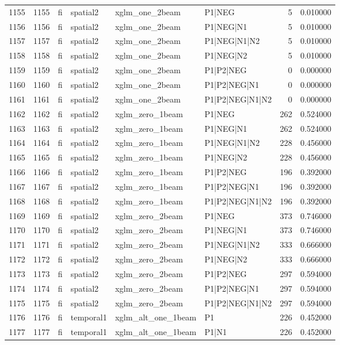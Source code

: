 \begin{tabular}{lrllllrr}
1155 & 1155 & fi & spatial2 & xglm_one_2beam & P1|NEG & 5 & 0.010000 \\
1156 & 1156 & fi & spatial2 & xglm_one_2beam & P1|NEG|N1 & 5 & 0.010000 \\
1157 & 1157 & fi & spatial2 & xglm_one_2beam & P1|NEG|N1|N2 & 5 & 0.010000 \\
1158 & 1158 & fi & spatial2 & xglm_one_2beam & P1|NEG|N2 & 5 & 0.010000 \\
1159 & 1159 & fi & spatial2 & xglm_one_2beam & P1|P2|NEG & 0 & 0.000000 \\
1160 & 1160 & fi & spatial2 & xglm_one_2beam & P1|P2|NEG|N1 & 0 & 0.000000 \\
1161 & 1161 & fi & spatial2 & xglm_one_2beam & P1|P2|NEG|N1|N2 & 0 & 0.000000 \\
1162 & 1162 & fi & spatial2 & xglm_zero_1beam & P1|NEG & 262 & 0.524000 \\
1163 & 1163 & fi & spatial2 & xglm_zero_1beam & P1|NEG|N1 & 262 & 0.524000 \\
1164 & 1164 & fi & spatial2 & xglm_zero_1beam & P1|NEG|N1|N2 & 228 & 0.456000 \\
1165 & 1165 & fi & spatial2 & xglm_zero_1beam & P1|NEG|N2 & 228 & 0.456000 \\
1166 & 1166 & fi & spatial2 & xglm_zero_1beam & P1|P2|NEG & 196 & 0.392000 \\
1167 & 1167 & fi & spatial2 & xglm_zero_1beam & P1|P2|NEG|N1 & 196 & 0.392000 \\
1168 & 1168 & fi & spatial2 & xglm_zero_1beam & P1|P2|NEG|N1|N2 & 196 & 0.392000 \\
1169 & 1169 & fi & spatial2 & xglm_zero_2beam & P1|NEG & 373 & 0.746000 \\
1170 & 1170 & fi & spatial2 & xglm_zero_2beam & P1|NEG|N1 & 373 & 0.746000 \\
1171 & 1171 & fi & spatial2 & xglm_zero_2beam & P1|NEG|N1|N2 & 333 & 0.666000 \\
1172 & 1172 & fi & spatial2 & xglm_zero_2beam & P1|NEG|N2 & 333 & 0.666000 \\
1173 & 1173 & fi & spatial2 & xglm_zero_2beam & P1|P2|NEG & 297 & 0.594000 \\
1174 & 1174 & fi & spatial2 & xglm_zero_2beam & P1|P2|NEG|N1 & 297 & 0.594000 \\
1175 & 1175 & fi & spatial2 & xglm_zero_2beam & P1|P2|NEG|N1|N2 & 297 & 0.594000 \\
1176 & 1176 & fi & temporal1 & xglm_alt_one_1beam & P1 & 226 & 0.452000 \\
1177 & 1177 & fi & temporal1 & xglm_alt_one_1beam & P1|N1 & 226 & 0.452000 \\

\end{tabular}
